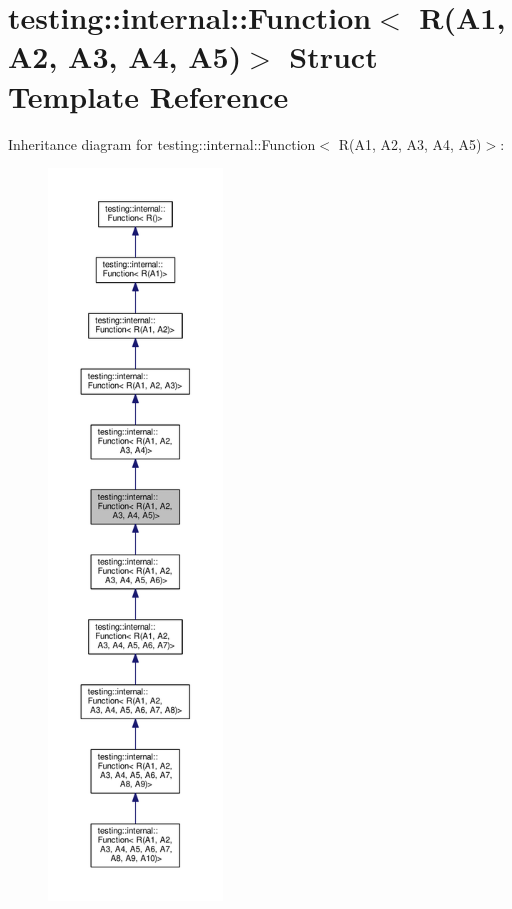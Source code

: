 \hypertarget{structtesting_1_1internal_1_1_function_3_01_r_07_a1_00_01_a2_00_01_a3_00_01_a4_00_01_a5_08_4}{}\section{testing\+:\+:internal\+:\+:Function$<$ R(A1, A2, A3, A4, A5)$>$ Struct Template Reference}
\label{structtesting_1_1internal_1_1_function_3_01_r_07_a1_00_01_a2_00_01_a3_00_01_a4_00_01_a5_08_4}


Inheritance diagram for testing\+:\+:internal\+:\+:Function$<$ R(A1, A2, A3, A4, A5)$>$\+:
\nopagebreak
\begin{figure}[H]
\begin{center}
\leavevmode
\includegraphics[height=550pt]{structtesting_1_1internal_1_1_function_3_01_r_07_a1_00_01_a2_00_01_a3_00_01_a4_00_01_a5_08_4__inherit__graph}
\end{center}
\end{figure}


